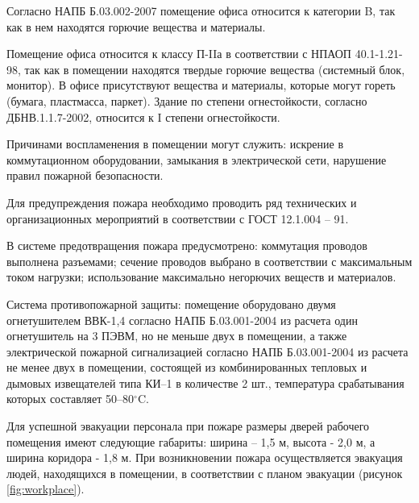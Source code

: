 Согласно НАПБ Б.03.002-2007 помещение офиса относится к категории B,
так как в нем находятся горючие вещества и материалы. 

Помещение офиса относится к классу П-IIа в соответствии с НПАОП 40.1-1.21-98, 
так как в помещении находятся твердые горючие вещества (системный блок, монитор). В офисе присутствуют 
вещества и материалы, которые могут гореть (бумага, пластмасса, паркет). Здание по степени огнестойкости,
согласно ДБНВ.1.1.7-2002, относится к I степени огнестойкости. 

Причинами воспламенения в помещении могут служить: искрение в коммутационном оборудовании, 
замыкания в электрической сети, нарушение правил пожарной безопасности. 

Для предупреждения пожара необходимо проводить ряд технических и организационных мероприятий в соответствии 
с ГОСТ 12.1.004 – 91.

В системе предотвращения пожара предусмотрено:
    коммутация проводов выполнена разъемами;
    сечение проводов выбрано в соответствии с максимальным током нагрузки;
    использование максимально негорючих веществ и материалов.

Система противопожарной защиты: помещение оборудовано двумя огнетушителем ВВК-1,4 согласно НАПБ Б.03.001-2004  из расчета один огнетушитель на 3 ПЭВМ,
но не меньше двух в помещении, а также электрической пожарной сигнализацией согласно НАПБ Б.03.001-2004 из расчета 
не менее двух в помещении, состоящей из комбинированных тепловых и дымовых извещателей типа КИ–1 в количестве 2 шт.,
температура срабатывания которых составляет 50–80$^{\circ}\mathrm{C}$.

Для успешной эвакуации персонала при пожаре размеры дверей рабочего помещения имеют следующие габариты: 
ширина  – 1,5 м, высота -  2,0 м, а ширина коридора - 1,8 м.  При возникновении пожара осуществляется эвакуация людей, 
находящихся в помещении, в соответствии с планом эвакуации (рисунок \ref{fig:workplace}).

